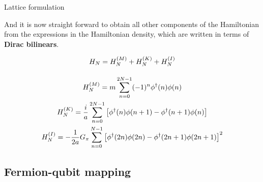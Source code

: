 \documentclass[9pt, aspectratio=169]{beamer}
\begin{document}
\begin{frame}[allowframebreaks]{Lattice formulation}
\break

	And it is now straight forward to obtain all other components of the Hamiltonian from the expressions in the Hamiltonian density, which are written in terms of \textbf{Dirac bilinears}.

	\vspace{1em}

	\begin{gather*}
	  H_{N} = H_{N}^{(M)} + H_{N}^{(K)} + H_{N}^{(I)}
	    \label{eq:NJL1-staggered-discretization} \\[10pt]
	  H_{N}^{(M)} =
	    m \sum_{n=0}^{2N-1} (-1)^{n}\phi^{\dagger}(n)\phi(n) \\
	  H_{N}^{(K)} =
	    \frac{i}{a} \sum_{n=0}^{2N-1} \qty[
	    \phi^{\dagger}(n)\phi(n+1) - \phi^{\dagger}(n+1)\phi(n)] \\
	  H_{N}^{(I)} =
	    - \frac{1}{2a} G_{\pi} \sum_{n=0}^{N-1} \qty[
	      \phi^{\dagger}(2n)\phi(2n) - \phi^{\dagger}(2n+1)\phi(2n+1)
	    ]^{2}
	\end{gather*}

\end{frame}


\subsection{Fermion-qubit mapping}
\end{document}
